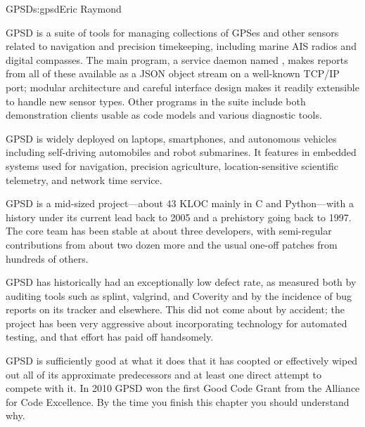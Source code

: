 \begin{aosachapter}{GPSD}{s:gpsd}{Eric Raymond}

GPSD is a suite of tools for managing collections of GPSes and other
sensors related to navigation and precision timekeeping, including
marine AIS radios and digital compasses. The main program, a service
daemon named , makes reports from all of these available as
a JSON object stream on a well-known TCP/IP port; modular architecture
and careful interface design makes it readily extensible to handle new
sensor types. Other programs in the suite include both demonstration
clients usable as code models and various diagnostic tools.


GPSD is widely deployed on laptops, smartphones, and autonomous
vehicles including self-driving automobiles and robot submarines. It
features in embedded systems used for navigation, precision
agriculture, location-sensitive scientific telemetry, and network time
service.

GPSD is a mid-sized project---about 43 KLOC mainly in C and
Python---with a history under its current lead back to 2005 and a
prehistory going back to 1997.  The core team has been stable at about
three developers, with semi-regular contributions from about two dozen
more and the usual one-off patches from hundreds of others.

GPSD has historically had an exceptionally low defect rate, as
measured both by auditing tools such as splint, valgrind, and Coverity
and by the incidence of bug reports on its tracker and elsewhere.
This did not come about by accident; the project has been very
aggressive about incorporating technology for automated testing, and
that effort has paid off handsomely.


GPSD is sufficiently good at what it does that it has coopted or
effectively wiped out all of its approximate predecessors and at least
one direct attempt to compete with it.  In 2010 GPSD won the first
Good Code Grant from the Alliance for Code Excellence.  By the time
you finish this chapter you should understand why.


\end{aosachapter}
